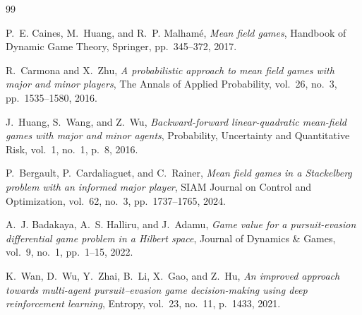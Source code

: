 \documentclass[11pt,a4paper]{article}
\begin{document}
\begin{thebibliography}{99}

P.~E. Caines, M.~Huang, and R.~P. Malham{\'e}, 
\emph{Mean field games}, Handbook of Dynamic Game Theory, Springer, pp.~345--372, 2017.

R.~Carmona and X.~Zhu, 
\emph{A probabilistic approach to mean field games with major and minor players}, 
The Annals of Applied Probability, vol.~26, no.~3, pp.~1535--1580, 2016.

J.~Huang, S.~Wang, and Z.~Wu, 
\emph{Backward-forward linear-quadratic mean-field games with major and minor agents}, 
Probability, Uncertainty and Quantitative Risk, vol.~1, no.~1, p.~8, 2016.

P.~Bergault, P.~Cardaliaguet, and C.~Rainer, 
\emph{Mean field games in a Stackelberg problem with an informed major player}, 
SIAM Journal on Control and Optimization, vol.~62, no.~3, pp.~1737--1765, 2024.

A.~J. Badakaya, A.~S. Halliru, and J.~Adamu, 
\emph{Game value for a pursuit-evasion differential game problem in a Hilbert space}, 
Journal of Dynamics \& Games, vol.~9, no.~1, pp.~1--15, 2022.

K.~Wan, D.~Wu, Y.~Zhai, B.~Li, X.~Gao, and Z.~Hu, 
\emph{An improved approach towards multi-agent pursuit--evasion game decision-making using deep reinforcement learning}, 
Entropy, vol.~23, no.~11, p.~1433, 2021.

\end{thebibliography}
\end{document}
